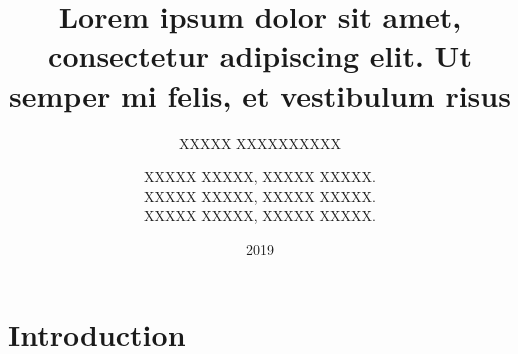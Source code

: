 



\title{Lorem ipsum dolor sit amet, consectetur adipiscing elit. Ut semper mi felis, et vestibulum risus}
\signature{XXXXX XXXXXXXXXX}
\author{XXXXX XXXXX, XXXXX XXXXX.  \par XXXXX XXXXX, XXXXX XXXXX.  \par XXXXX XXXXX, XXXXX XXXXX.}
\date{2019}

    \maketitle
    \tableofcontents
    \newpage


    \section{Introduction}


